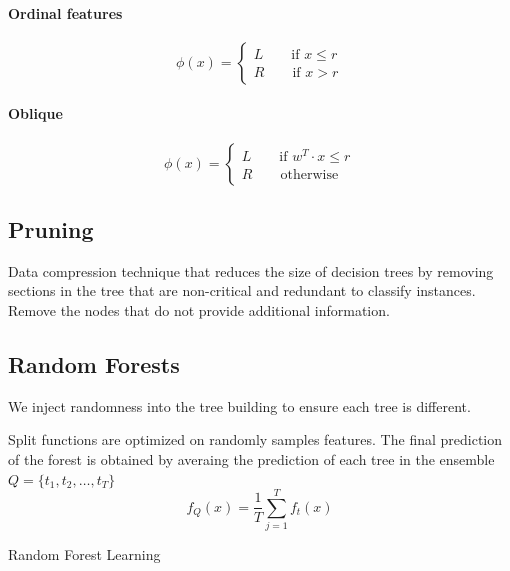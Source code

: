 \documentclass[a4paper,6pt,twocolumn,fleqn]{article}
\begin{document}
\paragraph{Ordinal features}
\begin{equation}
    \phi(x) = \begin{cases}
        L \qquad \text{if } x \leq r\\
        R \qquad \text{if } x > r
    \end{cases}
\end{equation}
\paragraph{Oblique}
\begin{equation}
    \phi(x) = \begin{cases}
        L \qquad \text{if } w^T \cdot x \leq r\\
        R \qquad \text{otherwise} 
    \end{cases}
\end{equation}
\subsection{Pruning} %
Data compression technique that reduces the size of decision trees by removing sections in the tree that are non-critical and redundant to classify instances. Remove the nodes that do not provide additional information.
\subsection{Random Forests} %
We inject randomness into the tree building to ensure each tree is different.

Split functions are optimized on randomly samples features. The final prediction of the forest is obtained by averaing the prediction of each tree in the ensemble \(Q = \{t_1, t_2, \ldots, t_T\}\)
\begin{equation}
    f_Q(x) = \frac 1 T \sum_{j=1}^T f_t(x)
\end{equation}
\begin{algorithm}
\caption{Random Forest Learning}
\label{alg:perceptron}
\end{algorithm}
\end{document}

